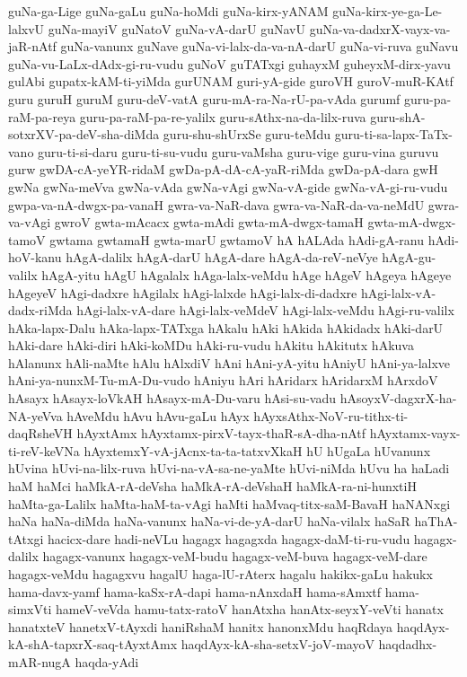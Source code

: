 {guNa-ga-Lige
guNa-gaLu
guNa-hoMdi
guNa-kirx-yANAM
guNa-kirx-ye-ga-Le-lalxvU
guNa-mayiV
guNatoV
guNa-vA-darU
guNavU
guNa-va-dadxrX-vayx-va-jaR-nAtf
guNa-vanunx
guNave
guNa-vi-lalx-da-va-nA-darU
guNa-vi-ruva
guNavu
guNa-vu-LaLx-dAdx-gi-ru-vudu
guNoV
guTATxgi
guhayxM
guheyxM-dirx-yavu
gulAbi
gupatx-kAM-ti-yiMda
gurUNAM
guri-yA-gide
guroVH
guroV-muR-KAtf
guru
guruH
guruM
guru-deV-vatA
guru-mA-ra-Na-rU-pa-vAda
gurumf
guru-pa-raM-pa-reya
guru-pa-raM-pa-re-yalilx
guru-sAthx-na-da-lilx-ruva
guru-shA-sotxrXV-pa-deV-sha-diMda
guru-shu-shUrxSe
guru-teMdu
guru-ti-sa-lapx-TaTx-vano
guru-ti-si-daru
guru-ti-su-vudu
guru-vaMsha
guru-vige
guru-vina
guruvu
gurw
gwDA-cA-yeYR-ridaM
gwDa-pA-dA-cA-yaR-riMda
gwDa-pA-dara
gwH
gwNa
gwNa-meVva
gwNa-vAda
gwNa-vAgi
gwNa-vA-gide
gwNa-vA-gi-ru-vudu
gwpa-va-nA-dwgx-pa-vanaH
gwra-va-NaR-dava
gwra-va-NaR-da-va-neMdU
gwra-va-vAgi
gwroV
gwta-mAcacx
gwta-mAdi
gwta-mA-dwgx-tamaH
gwta-mA-dwgx-tamoV
gwtama
gwtamaH
gwta-marU
gwtamoV
hA
hALAda
hAdi-gA-ranu
hAdi-hoV-kanu
hAgA-dalilx
hAgA-darU
hAgA-dare
hAgA-da-reV-neVye
hAgA-gu-valilx
hAgA-yitu
hAgU
hAgalalx
hAga-lalx-veMdu
hAge
hAgeV
hAgeya
hAgeye
hAgeyeV
hAgi-dadxre
hAgilalx
hAgi-lalxde
hAgi-lalx-di-dadxre
hAgi-lalx-vA-dadx-riMda
hAgi-lalx-vA-dare
hAgi-lalx-veMdeV
hAgi-lalx-veMdu
hAgi-ru-valilx
hAka-lapx-Dalu
hAka-lapx-TATxga
hAkalu
hAki
hAkida
hAkidadx
hAki-darU
hAki-dare
hAki-diri
hAki-koMDu
hAki-ru-vudu
hAkitu
hAkitutx
hAkuva
hAlanunx
hAli-naMte
hAlu
hAlxdiV
hAni
hAni-yA-yitu
hAniyU
hAni-ya-lalxve
hAni-ya-nunxM-Tu-mA-Du-vudo
hAniyu
hAri
hAridarx
hAridarxM
hArxdoV
hAsayx
hAsayx-loVkAH
hAsayx-mA-Du-varu
hAsi-su-vadu
hAsoyxV-dagxrX-ha-NA-yeVva
hAveMdu
hAvu
hAvu-gaLu
hAyx
hAyxsAthx-NoV-ru-tithx-ti-daqRsheVH
hAyxtAmx
hAyxtamx-pirxV-tayx-thaR-sA-dha-nAtf
hAyxtamx-vayx-ti-reV-keVNa
hAyxtemxY-vA-jAcnx-ta-ta-tatxvXkaH
hU
hUgaLa
hUvanunx
hUvina
hUvi-na-lilx-ruva
hUvi-na-vA-sa-ne-yaMte
hUvi-niMda
hUvu
ha
haLadi
haM
haMci
haMkA-rA-deVsha
haMkA-rA-deVshaH
haMkA-ra-ni-hunxtiH
haMta-ga-Lalilx
haMta-haM-ta-vAgi
haMti
haMvaq-titx-saM-BavaH
haNANxgi
haNa
haNa-diMda
haNa-vanunx
haNa-vi-de-yA-darU
haNa-vilalx
haSaR
haThA-tAtxgi
hacicx-dare
hadi-neVLu
hagagx
hagagxda
hagagx-daM-ti-ru-vudu
hagagx-dalilx
hagagx-vanunx
hagagx-veM-budu
hagagx-veM-buva
hagagx-veM-dare
hagagx-veMdu
hagagxvu
hagalU
haga-lU-rAterx
hagalu
hakikx-gaLu
hakukx
hama-davx-yamf
hama-kaSx-rA-dapi
hama-nAnxdaH
hama-sAmxtf
hama-simxVti
hameV-veVda
hamu-tatx-ratoV
hanAtxha
hanAtx-seyxY-veVti
hanatx
hanatxteV
hanetxV-tAyxdi
haniRshaM
hanitx
hanonxMdu
haqRdaya
haqdAyx-kA-shA-tapxrX-saq-tAyxtAmx
haqdAyx-kA-sha-setxV-joV-mayoV
haqdadhx-mAR-nugA
haqda-yAdi
}
